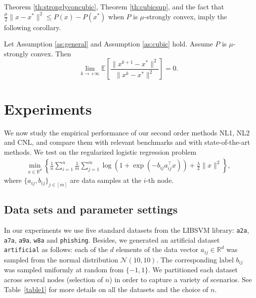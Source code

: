 \documentclass[10pt]{article}
\newcommand{\squeeze}{}
\newcommand{\R}{\mathbb{R}}
\begin{document}
Theorem \ref{th:stronglyconcubic}, Theorem \ref{th:cubicsup}, and the fact that $\frac{\mu}{2} \|x-x^*\|^2 \leq P(x) - P(x^*)$ when $P$ is $\mu$-strongly convex, imply the following corollary. 

\begin{corollary}\label{co:supcubic}
	Let Assumption \ref{as:general} and Assumption \ref{as:cubic} hold. Assume $P$ is $\mu$-strongly convex. Then 
	$$
	\lim\limits_{k\to +\infty} \mathbb{E} \left[  \frac{\|x^{k+1} - x^*\|^2}{\|x^k - x^*\|^2 }  \right] =0. 
	$$
\end{corollary}








\section{Experiments}
\label{sec:experiments}



We now study the empirical performance of our second order methods {\sf NL1}, {\sf NL2} and {\sf CNL}, and compare them with relevant benchmarks and with state-of-the-art methods. We  test on  the regularized logistic regression problem
\begin{eqnarray*}\squeeze
	\min\limits_{x\in\R^d}\left\{\frac{1}{n}\sum\limits_{i=1}^n\frac{1}{m}\sum\limits_{j=1}^m\log\left(1+\exp(-b_{ij}a_{ij}^\top x)\right) + \frac{\lambda}{2}\|x\|^2\right\},
\end{eqnarray*}
where $\{a_{ij}, b_{ij}\}_{j\in[m]}$ are data samples at the $i$-th node. 







\subsection{Data sets and parameter settings} 

In our experiments we use five standard datasets from the LIBSVM library:  {\tt a2a}, {\tt a7a}, {\tt a9a},  {\tt w8a} and {\tt phishing}. Besides, we generated an artificial dataset {\tt artificial} as follows: each of the $d$ elements of the data vector $a_{ij}\in \R^d$ was sampled from the normal distribution $\mathcal{N} (10, 10).$ The corresponding label $b_{ij}$ was sampled uniformly at random from $\{-1, 1\}$. We partitioned each dataset across several nodes (selection of $n$)  in order to capture a variety of scenarios. See Table~\ref{table1} for more details on all the datasets and the choice of $n$. 
\end{document}

